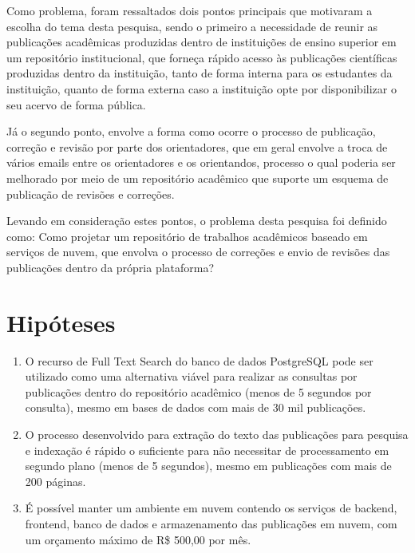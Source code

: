 Como problema, foram ressaltados dois pontos principais que motivaram a
escolha do tema desta pesquisa, sendo o primeiro a necessidade de reunir
as publicações acadêmicas produzidas dentro de instituições de ensino
superior em um repositório institucional, que forneça rápido acesso às
publicações científicas produzidas dentro da instituição, tanto de forma
interna para os estudantes da instituição, quanto de forma externa caso
a instituição opte por disponibilizar o seu acervo de forma pública.

Já o segundo ponto, envolve a forma como ocorre o processo de publicação,
correção e revisão por parte dos orientadores, que em geral envolve a
troca de vários emails entre os orientadores e os orientandos,
processo o qual poderia ser melhorado por meio de um repositório
acadêmico que suporte um esquema de publicação de revisões e correções.

Levando em consideração estes pontos, o problema desta pesquisa
foi definido como: Como projetar um repositório de trabalhos
acadêmicos baseado em serviços de nuvem, que envolva o processo
de correções e envio de revisões das publicações dentro
da própria plataforma?

\section{Hipóteses} \label{sec::Hypothesis}
\begin{enumerate}
    \item O recurso de Full Text Search do banco de dados PostgreSQL
          pode ser utilizado como uma alternativa viável para realizar
          as consultas por publicações dentro do repositório acadêmico
          (menos de 5 segundos por consulta), mesmo em bases de dados
          com mais de 30 mil publicações.

    \item O processo desenvolvido para extração do texto das publicações
          para pesquisa e indexação é rápido o suficiente para não
          necessitar de processamento em segundo plano (menos de 5 segundos),
          mesmo em publicações com mais de 200 páginas.

    \item É possível manter um ambiente em nuvem contendo os serviços
          de backend, frontend, banco de dados e armazenamento das
          publicações em nuvem, com um orçamento máximo de R\$ 500,00
          por mês.

\end{enumerate}


